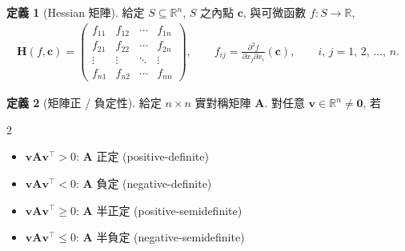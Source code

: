 \documentclass[12pt]{extarticle}
\newcommand{\ds}{\displaystyle}
\theoremstyle{definition}
\newtheorem*{dfn}{定義}
\newcommand{\vv}{\mathbf{v}}
\newcommand{\vc}{\mathbf{c}}
\newcommand{\vH}{\mathbf{H}}
\newcommand{\vA}{\mathbf{A}}
\newcommand{\vZero}{\mathbf{0}}
\begin{document}
\begin{dfn}[Hessian 矩陣]
  給定 $\ds S\subseteq\mathbb{R}^n$, $S$ 之內點 $\vc$, 與可微函數 $\ds f:S\to\mathbb{R}$, 
  \begin{align*}
    \vH(f, \vc) = \begin{pmatrix}f_{11} & f_{12} & \cdots & f_{1n} \\ f_{21} & f_{22} & \cdots & f_{2n} \\ \vdots & \vdots & \ddots & \vdots \\ f_{n1} & f_{n2} & \cdots & f_{nn}\end{pmatrix}, \qquad f_{ij} = \frac{\partial^2 f}{\partial x_j\partial x_i}(\vc), \qquad i,\,j = 1,\,2,\,\ldots,\,n.
  \end{align*}
\end{dfn}

\begin{dfn}[矩陣正 / 負定性] 
  給定 $n\times n$ 實對稱矩陣 $\vA$. 對任意 $\ds\vv\in\mathbb{R}^n\ne\vZero$, 若 
  \begin{multicols}{2}
    \begin{itemize}\setlength\itemsep{0em}
      \item $\ds\vv\vA\vv^\top > 0$: $\vA$ 正定 (positive-definite)
      \item $\ds\vv\vA\vv^\top < 0$: $\vA$ 負定 (negative-definite)
      \item $\ds\vv\vA\vv^\top \geqslant 0$: $\vA$ 半正定 (positive-semidefinite)
      \item $\ds\vv\vA\vv^\top \leqslant 0$: $\vA$ 半負定 (negative-semidefinite)
    \end{itemize}
  \end{multicols}
\end{dfn}
\end{document}
